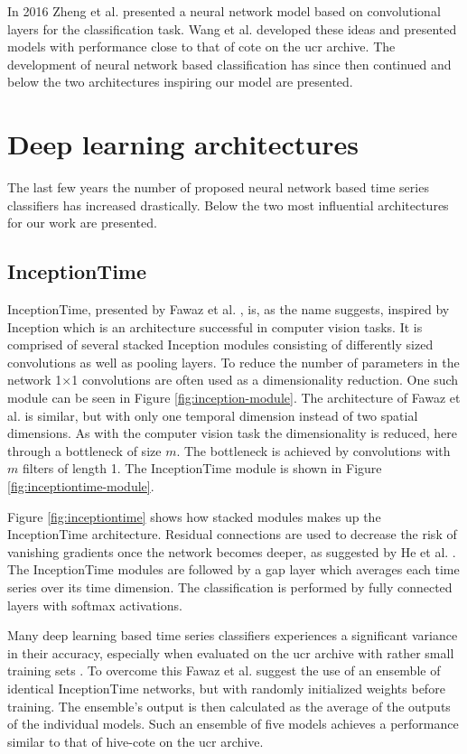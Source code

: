 In 2016 Zheng et al. \cite{Zheng2016} presented a neural network model based on convolutional layers for the classification task. Wang et al. \cite{Wang2017} developed these ideas and presented models with performance close to that of \gls{cote} on the \gls{ucr} archive. The development of neural network based classification has since then continued and below the two architectures inspiring our model are presented.

\section{Deep learning architectures}
The last few years the number of proposed neural network based time series classifiers has increased drastically. Below the two most influential architectures for our work are presented.

\subsection{InceptionTime}
InceptionTime, presented by Fawaz et al. \cite{IsmailFawaz2020}, is, as the name suggests, inspired by Inception \cite{Szegedy2015} which is an architecture successful in computer vision tasks. It is comprised of several stacked Inception modules consisting of differently sized convolutions as well as pooling layers. To reduce the number of parameters in the network 1$\times$1 convolutions are often used as a dimensionality reduction. One such module can be seen in Figure \ref{fig:inception-module}. The architecture of Fawaz et al. is similar, but with only one temporal dimension instead of two spatial dimensions. As with the computer vision task the dimensionality is reduced, here through a bottleneck of size $m$. The bottleneck is achieved by convolutions with $m$ filters of length 1. The InceptionTime module is shown in Figure \ref{fig:inceptiontime-module}.

Figure \ref{fig:inceptiontime} shows how stacked modules makes up the InceptionTime architecture. Residual connections are used to decrease the risk of vanishing gradients once the network becomes deeper, as suggested by He et al. \cite{He2016}. The InceptionTime modules are followed by a \gls{gap} layer which averages each time series over its time dimension. The classification is performed by fully connected layers with softmax activations.

Many deep learning based time series classifiers experiences a significant variance in their accuracy, especially when evaluated on the \gls{ucr} archive with rather small training sets \cite{IsmailFawaz2019ensemble}. To overcome this Fawaz et al. suggest the use of an ensemble of identical InceptionTime networks, but with randomly initialized weights before training. The ensemble's output is then calculated as the average of the outputs of the individual models. Such an ensemble of five models achieves a performance similar to that of \gls{hive-cote} on the \gls{ucr} archive.

